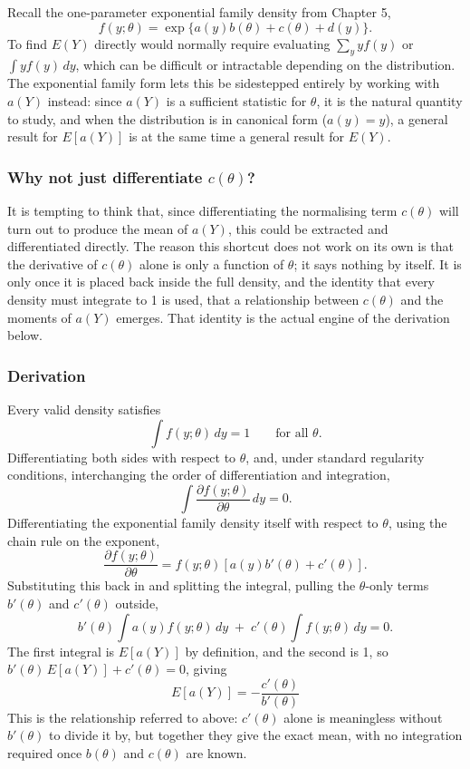 \documentclass[12pt,a4paper]{report}
\begin{document}
Recall the one-parameter exponential family density from Chapter 5,
\[
f(y;\theta) = \exp\{a(y)b(\theta) + c(\theta) + d(y)\}.
\]
To find $E(Y)$ directly would normally require evaluating $\sum_y y f(y)$ or $\int y f(y)\,dy$, which can be difficult or intractable depending on the distribution. The exponential family form lets this be sidestepped entirely by working with $a(Y)$ instead: since $a(Y)$ is a sufficient statistic for $\theta$, it is the natural quantity to study, and when the distribution is in canonical form ($a(y) = y$), a general result for $E[a(Y)]$ is at the same time a general result for $E(Y)$.

\subsubsection*{Why not just differentiate $c(\theta)$?}

It is tempting to think that, since differentiating the normalising term $c(\theta)$ will turn out to produce the mean of $a(Y)$, this could be extracted and differentiated directly. The reason this shortcut does not work on its own is that the derivative of $c(\theta)$ alone is only a function of $\theta$; it says nothing by itself. It is only once it is placed back inside the full density, and the identity that every density must integrate to 1 is used, that a relationship between $c(\theta)$ and the moments of $a(Y)$ emerges. That identity is the actual engine of the derivation below.

\subsubsection*{Derivation}

Every valid density satisfies
\[
\int f(y;\theta)\, dy = 1 \qquad \text{for all } \theta.
\]
Differentiating both sides with respect to $\theta$, and, under standard regularity conditions, interchanging the order of differentiation and integration,
\[
\int \frac{\partial f(y;\theta)}{\partial \theta}\, dy = 0.
\]
Differentiating the exponential family density itself with respect to $\theta$, using the chain rule on the exponent,
\[
\frac{\partial f(y;\theta)}{\partial \theta} = f(y;\theta)\left[a(y)b'(\theta) + c'(\theta)\right].
\]
Substituting this back in and splitting the integral, pulling the $\theta$-only terms $b'(\theta)$ and $c'(\theta)$ outside,
\[
b'(\theta)\int a(y) f(y;\theta)\, dy \;+\; c'(\theta)\int f(y;\theta)\, dy = 0.
\]
The first integral is $E[a(Y)]$ by definition, and the second is 1, so $b'(\theta)\,E[a(Y)] + c'(\theta) = 0$, giving
\[
\boxed{E[a(Y)] = -\frac{c'(\theta)}{b'(\theta)}}
\]
This is the relationship referred to above: $c'(\theta)$ alone is meaningless without $b'(\theta)$ to divide it by, but together they give the exact mean, with no integration required once $b(\theta)$ and $c(\theta)$ are known.
\end{document}
